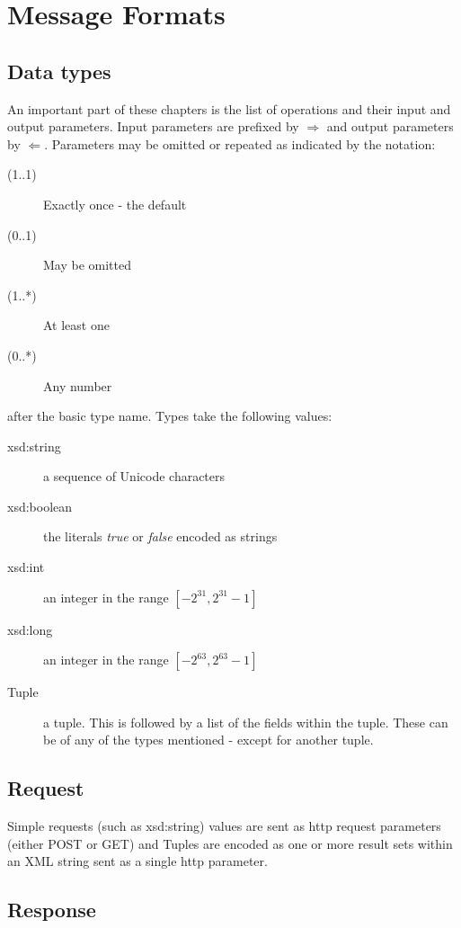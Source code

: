 \section{Message Formats}\label{sec:MessageFormat}

\subsection{Data types}

An important part of these chapters is the list of operations and their input 
and output parameters. Input parameters are prefixed by $\Rightarrow$ and 
output parameters by $\Leftarrow$. Parameters may be omitted or repeated as
indicated by the notation:

\begin{description}
\item[(1..1)] Exactly once - the default
\item[(0..1)] May be omitted
\item[(1..*)] At least one
\item[(0..*)] Any number
\end{description}

after the basic type name. Types take the following values:

\begin{description}
\item[xsd:string] a sequence of Unicode characters
\item[xsd:boolean] the literals \textit{true} or \textit{false} encoded as strings
\item[xsd:int] an integer in the range $[-2^{31},2^{31} -1]$
\item[xsd:long] an integer in the range $[-2^{63},2^{63} -1]$
\item[Tuple] a tuple. This is followed by a list of the fields within the tuple.
These can be of any of the types mentioned - except for another tuple.
\end{description}

\subsection{Request}

Simple requests (such as xsd:string) values are sent as http request parameters 
(either POST or GET) and Tuples are encoded as one or more result sets within 
an XML string sent as a single http parameter. 

\subsection{Response}

